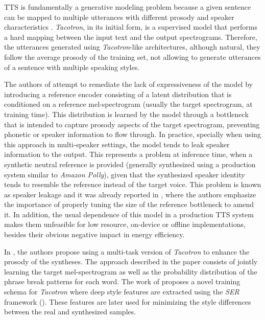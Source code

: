 TTS is fundamentally a generative modeling problem because a given sentence can be mapped to multiple utterances with different prosody and speaker characteristics \autocite{Taylor2009}. \textit{Tacotron}, in its initial form, is a supervised model that performs a hard mapping between the input text and the output spectrograms. Therefore, the utterances generated using \textit{Tacotron}-like architectures, although natural, they follow the average prosody of the training set, not allowing to generate utterances of a sentence with multiple speaking styles.

The authors of \autocite{skerryryan2018} attempt to remediate the lack of expressiveness of the model by introducing a reference encoder consisting of a latent distribution that is conditioned on a reference mel-spectrogram (usually the target spectrogram, at training time). This distribution is learned by the model through a bottleneck that is intended to capture prosody aspects of the target spectrogram, preventing phonetic or speaker information to flow through. In practice, specially when using this approach in multi-speaker settings, the model tends to leak speaker information to the output. This represents a problem at inference time, when a synthetic neutral reference is provided (generally synthesized using a production system similar to \textit{Amazon Polly}), given that the synthesized speaker identity tends to resemble the reference instead of the target voice. This problem is known as speaker leakage and it was already reported in \autocite{skerryryan2018}, where the authors emphasize the importance of properly tuning the size of the reference bottleneck to amend it. In addition, the usual dependence of this model in a production TTS system makes them unfeasible for low resource, on-device or offline implementations, besides their obvious negative impact in energy efficiency.

In \autocite{liu2020c}, the authors propose using a multi-task version of \textit{Tacotron} to enhance the prosody of the syntheses. The approach described in the paper consists of jointly learning the target mel-spectrogram as well as the probability distribution of the phrase break patterns for each word. The work of \autocite{liu2020c} proposes a novel training schema for \textit{Tacotron} where deep style features are extracted using the \textit{SER} framework (\autocite{Zhang2018, Lotfian2019}). These features are later used for minimizing the style differences between the real and synthesized samples.


